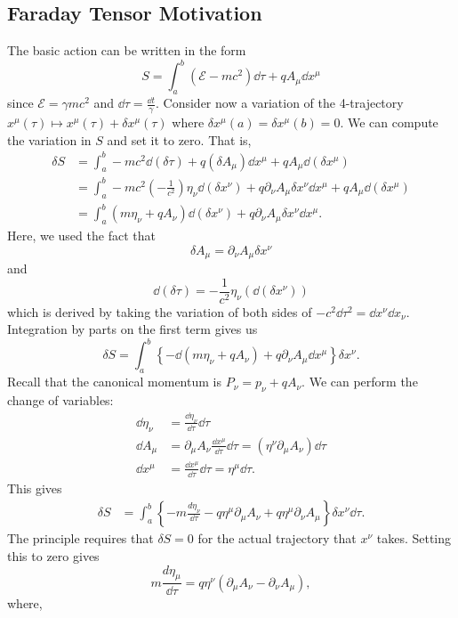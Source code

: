 \documentclass{article}
\numberwithin{equation}{subsection}
\begin{document}
\subsection{Faraday Tensor Motivation}
The basic action can be written in the form 
\begin{equation*}
    S = \int_a^b \left(\mathcal{E} - mc^2\right)\dd{\tau} + qA_\mu \dd{x}^\mu
\end{equation*}
since $\mathcal{E} = \gamma mc^2$ and $\dd{\tau} = \frac{\dd{t}}{\gamma}.$ Consider now a variation of the 4-trajectory $x^\mu(\tau) \mapsto x^\mu(\tau) + \delta x^{\mu}(\tau)$ where $\delta x^{\mu}(a) = \delta x^{\mu}(b) = 0.$ We can compute the variation in $S$ and set it to zero. That is,
\begin{align*}
    \delta S &= \int_a^b -mc^2 \dd{(\delta \tau)} + q(\delta A_\mu) \dd{x}^\mu + qA_\mu \dd{(\delta x^{\mu})} \\ 
    &= \int_a^b - mc^2 \left(-\frac{1}{c^2}\right) \eta_\nu \dd{(\delta x^\nu)} + q\partial_\nu A_\mu \delta x^{\nu}\dd{x}^\mu + qA_\mu \dd{(\delta x^\mu)} \\ 
    &= \int_a^b (m\eta_\nu + qA_\nu)\dd(\delta x^\nu) + q\partial_\nu A_\mu \delta x^\nu \dd{x^\mu}.
\end{align*}
Here, we used the fact that
\begin{equation*}
    \delta A_\mu = \partial_\nu A_{\mu} \delta x^\nu
\end{equation*}
and 
\begin{equation*}
    \dd(\delta \tau) = -\frac{1}{c^2}\eta_\nu(\dd{(\delta x^\nu)})
\end{equation*}
which is derived by taking the variation of both sides of $-c^2 \dd{\tau}^2 = \dd{x}^\nu \dd{x}_\nu.$ Integration by parts on the first term gives us 
\begin{equation*}
    \delta S = \int_a^b \left\{-\dd{(m\eta_\nu + qA_\nu) + q\partial_\nu A_\mu \dd{x}^\mu}\right\} \delta x^\nu.
\end{equation*}
Recall that the canonical momentum is $P_\nu = p_\nu + qA_\nu.$ We can perform the change of variables:
\begin{align*}
    \dd{\eta}_\nu &= \frac{\dd{\eta_\nu}}{\dd{\tau}}\dd{\tau} \\ 
    \dd{A}_\mu &= \partial_\mu A_\nu \frac{\dd{x}^\mu}{\dd{\tau}}\dd{\tau} = (\eta^\nu \partial_\mu A_\nu) \dd{\tau} \\ 
    \dd{x^\mu} &= \frac{\dd{x}^\mu}{\dd{\tau}}\dd{\tau} = \eta^\mu \dd{\tau}.
\end{align*} 
This gives 
\begin{align*}
    \delta S &= \int_a^b \left\{ - m \frac{d\eta_\nu}{\dd{\tau}} - q\eta^\mu \partial_\mu A_\nu + q\eta^\mu \partial_\nu A_\mu\right\} \delta x^\nu \dd{\tau}.
\end{align*}
The principle requires that $\delta S = 0$ for the actual trajectory that $x^\nu$ takes. Setting this to zero gives 
\begin{equation*}
    m\frac{d\eta_\mu}{\dd{\tau}} = q\eta^\nu \left(\partial_\mu A_\nu - \partial_\nu A_\mu\right),
\end{equation*}
where,
\end{document}
